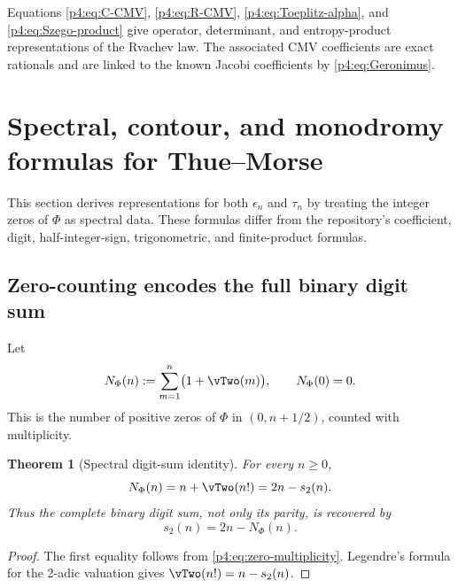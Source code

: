 \documentclass[11pt,oneside]{article}
\newtheorem{theorem}{Theorem}[section]
\theoremstyle{definition}
\begin{document}
\begin{novelbox}
Equations \eqref{p4:eq:C-CMV}, \eqref{p4:eq:R-CMV}, \eqref{p4:eq:Toeplitz-alpha}, and
\eqref{p4:eq:Szego-product} give operator, determinant, and entropy-product representations of
the Rvachev law. The associated CMV coefficients are exact rationals and are linked to the
known Jacobi coefficients by \eqref{p4:eq:Geronimus}.
\end{novelbox}

\section{Spectral, contour, and monodromy formulas for Thue--Morse}
\label{p4:sec:TM}

This section derives representations for both \(\epsilon_n\) and \(\tau_n\) by treating the
integer zeros of \(\Phi\) as spectral data. These formulas differ from the repository's
coefficient, digit, half-integer-sign, trigonometric, and finite-product formulas.

\subsection{Zero-counting encodes the full binary digit sum}

Let
\begin{equation}
 N_\Phi(n):=\sum_{m=1}^{n}\bigl(1+\vTwo(m)\bigr),\qquad N_\Phi(0)=0.
 \label{p4:eq:Nphi-def}
\end{equation}
This is the number of positive zeros of \(\Phi\) in \((0,n+1/2)\), counted with multiplicity.

\begin{theorem}[Spectral digit-sum identity]
\label{p4:thm:spectral-digit-sum}
For every \(n\ge0\),
\begin{equation}
 N_\Phi(n)=n+\vTwo(n!)=2n-s_2(n).
 \label{p4:eq:Nphi-digit}
\end{equation}
Thus the complete binary digit sum, not only its parity, is recovered by
\begin{equation}
 \boxed{\displaystyle s_2(n)=2n-N_\Phi(n).}
 \label{p4:eq:digit-from-spectrum}
\end{equation}
\end{theorem}

\begin{proof}
The first equality follows from \eqref{p4:eq:zero-multiplicity}. Legendre's formula for the
2-adic valuation gives \(\vTwo(n!)=n-s_2(n)\).
\end{proof}
\end{document}
